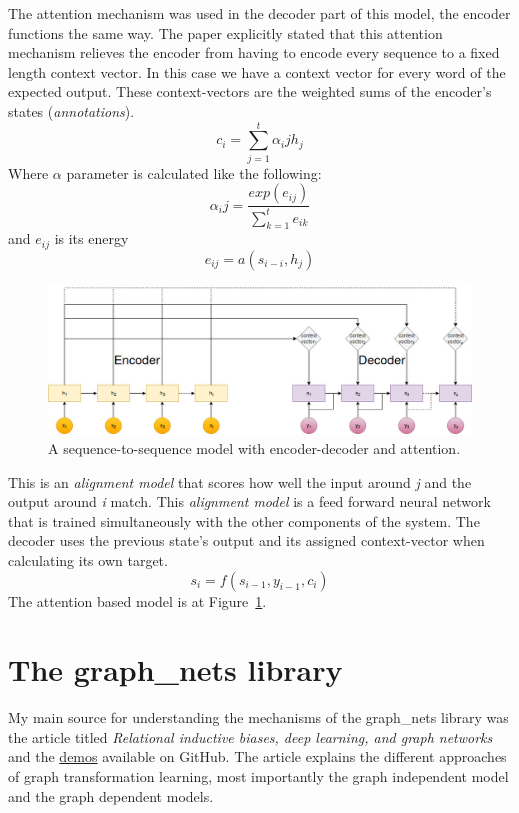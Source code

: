 The attention mechanism was used in the decoder part of this model, the encoder functions the same way. The paper explicitly stated that this attention mechanism relieves the encoder from having to encode every sequence to a fixed length context vector. In this case we have a context vector for every word of the expected output. These context-vectors are the weighted sums of the encoder's states (\textit{annotations}).
\[c_i = \sum_{j=1}^{t} \alpha_ij h_j\]
Where \(\alpha\) parameter is calculated like the following:
\[\alpha_ij = \frac{exp(e_{ij})}{\sum_{k=1}^{t} e_{ik}} \]
and \(e_{ij}\) is its energy
\[e_{ij} = a(s_{i-i}, h_j)\]

\begin{figure}[!ht]
	\centering
	\includegraphics[width=150mm, keepaspectratio]{figures/attention.jpg}
	\caption{A sequence-to-sequence model with encoder-decoder and attention.}
	\label{fig:attention}
\end{figure}

This is an \textit{alignment model} that scores how well the input around \textit{j} and the output around \textit{i} match. This \textit{alignment model} is a feed forward neural network that is trained simultaneously with the other components of the system.
The decoder uses the previous state's output and its assigned context-vector when calculating its own target.
\[s_i = f(s_{i-1}, y_{i-1}, c_i)\]
The attention based model is at Figure~\ref{fig:attention}.


\section{The graph\_nets library}
My main source for understanding the mechanisms of the graph\_nets library was the article titled \textit{Relational inductive biases, deep learning, and graph networks}\cite{GraphNet} and the \href{https://github.com/deepmind/graph_nets/tree/master/graph_nets/demos}{demos} available on GitHub.
The article explains the different approaches of graph transformation learning, most importantly the graph independent model and the graph dependent models.

